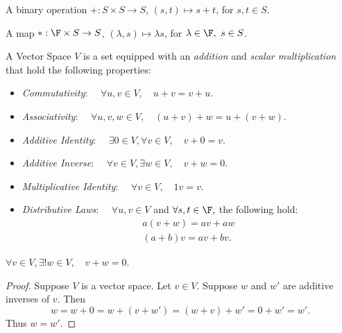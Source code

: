 \documentclass[12pt]{book}
\begin{document}
\begin{definition}[Addition]\label{def:addition}
    A binary operation $+: S \times S \to S$, $(s,t) \mapsto s+t$, for $s,t \in S$.
\end{definition}

\begin{definition}\label{def:scalar-mult}
    A map $*: \F \times S \to S$, $(\lambda, s) \mapsto \lambda s$, for $\lambda \in \F,\ s \in S$.
\end{definition}



\begin{definition} \label{def:vector-space}
    A Vector Space $V$ is a set equipped with an \emph{addition} and \emph{scalar multiplication} that hold the following properties:
    \begin{itemize}
        \item \emph{Commutativity}: $\quad \forall u,v \in V, \quad u+v=v+u.$ 
        \item \emph{Associativity}: $\quad \forall u,v,w \in V, \quad (u + v) + w = u + (v + w).$ 
        \item \emph{Additive Identity}: $\quad \exists 0 \in V, \forall v \in V, \quad v + 0 = v.$
        \item \emph{Additive Inverse}: $\quad \forall v \in V, \exists w \in V, \quad v + w = 0.$
        \item \emph{Multiplicative Identity}: $\quad \forall v \in V, \quad 1v = v.$
        \item \emph{Distributive Laws}: $\quad \forall u,v \in V$ and $ \forall s,t \in \F,$ the following hold:
            \[
            \begin{aligned}
                a(v + w) = av + aw \\ 
                (a + b)v = av + bv.
            \end{aligned}
            \]
    \end{itemize}
\end{definition}


\begin{theorem}\label{thm:unique-add-inv}
    $\forall v \in V, \exists! w \in V, \quad v + w = 0.$
\end{theorem}
\begin{proof}
    Suppose $V$ is a vector space. Let $ v \in V.$ Suppose $w$ and $w'$ are additive inverses of $v.$ Then
    \[
        w = w + 0 = w + (v +w') = (w + v) + w' = 0 + w' = w'.
    \]
    Thus $w = w'$. 
\end{proof}
\end{document}
